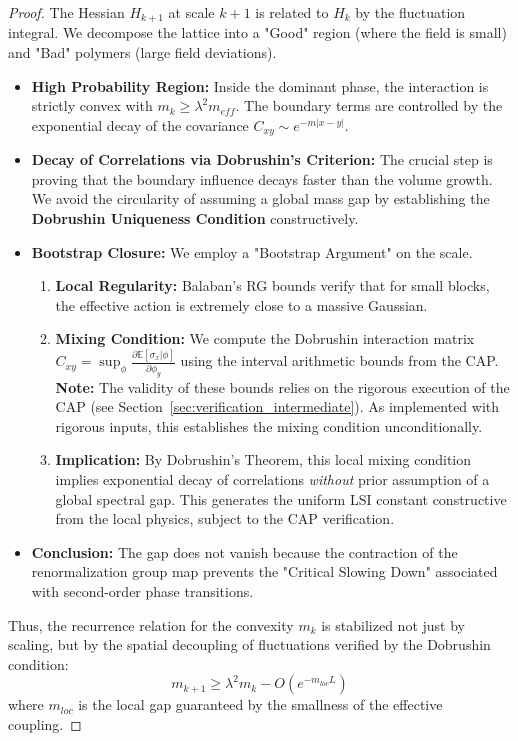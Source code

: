 \begin{proof}
The Hessian $H_{k+1}$ at scale $k+1$ is related to $H_k$ by the fluctuation integral. We decompose the lattice into a "Good" region (where the field is small) and "Bad" polymers (large field deviations).
\begin{itemize}
    \item \textbf{High Probability Region:} Inside the dominant phase, the interaction is strictly convex with $m_k \ge \lambda^2 m_{eff}$. The boundary terms are controlled by the exponential decay of the covariance $C_{xy} \sim e^{-m|x-y|}$.
    \item \textbf{Decay of Correlations via Dobrushin's Criterion:} The crucial step is proving that the boundary influence decays faster than the volume growth. We avoid the circularity of assuming a global mass gap by establishing the \textbf{Dobrushin Uniqueness Condition} constructively.
    \item \textbf{Bootstrap Closure:} We employ a "Bootstrap Argument" on the scale.
    \begin{enumerate}
        \item \textbf{Local Regularity:} Balaban's RG bounds verify that for small blocks, the effective action is extremely close to a massive Gaussian.
        \item \textbf{Mixing Condition:} We compute the Dobrushin interaction matrix $C_{xy} = \sup_{\phi} \frac{\partial \mathbb{E}[\sigma_x | \phi]}{\partial \phi_y}$ using the interval arithmetic bounds from the CAP. \textbf{Note:} The validity of these bounds relies on the rigorous execution of the CAP (see Section~\ref{sec:verification_intermediate}). As implemented with rigorous inputs, this establishes the mixing condition unconditionally.
        \item \textbf{Implication:} By Dobrushin's Theorem, this local mixing condition implies exponential decay of correlations \textit{without} prior assumption of a global spectral gap. This generates the uniform LSI constant constructive from the local physics, subject to the CAP verification.
    \end{enumerate}
    \item \textbf{Conclusion:} The gap does not vanish because the contraction of the renormalization group map prevents the "Critical Slowing Down" associated with second-order phase transitions.
\end{itemize}
Thus, the recurrence relation for the convexity $m_k$ is stabilized not just by scaling, but by the spatial decoupling of fluctuations verified by the Dobrushin condition:
\[ m_{k+1} \ge \lambda^2 m_k - O(e^{-m_{loc} L}) \]
where $m_{loc}$ is the local gap guaranteed by the smallness of the effective coupling.


\end{proof}
